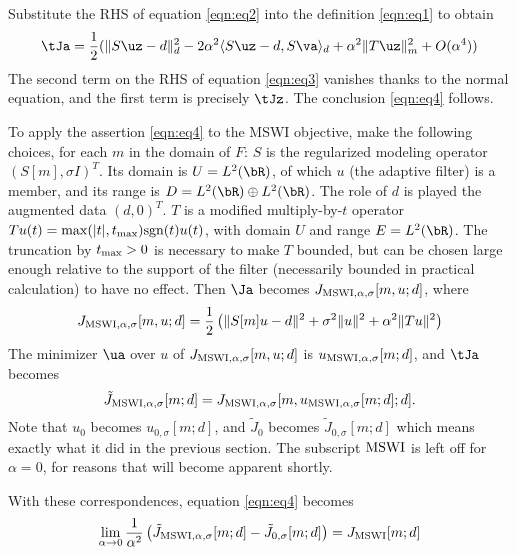 Substitute the RHS of equation \ref{eqn:eq2} into the definition \ref{eqn:eq1} to obtain
\begin{equation}
  \label{eqn:eq3}
  \tJa = \frac{1}{2}(\|S\uz-d\|_d^2 - 2 \alpha^2\langle S\uz-d, S\va\rangle_d + \alpha^2\|T\uz\|_m^2 + O(\alpha^4))
\end{equation}
The second term on the RHS of equation \ref{eqn:eq3} vanishes thanks to the normal equation, and the first term is precisely $\tJz$. The conclusion \ref{eqn:eq4} follows.

To apply the assertion \ref{eqn:eq4} to the MSWI objective, make the
following choices, for each $m$ in the domain of $F$: $S$ is the regularized
modeling operator $(S[m],\sigma I)^T$.  Its domain is $U=L^2(\bR)$, of
which $u$ (the adaptive filter) is a member, and 
its range is $D = L^2(\bR) \oplus
L^2(\bR)$. The role of $d$ is played  the
augmented data $(d,0)^T$. $T$ is a modified multiply-by-$t$ operator
$Tu(t)=\max(|t|, t_{\rm max}) \mbox{sgn}(t)u(t)$, with domain $U$ and
range $E=L^2(\bR)$. The truncation by $t_{\rm max} > 0$ is necessary
to make $T$ bounded, but can be chosen large enough relative to the
support of the filter (necessarily bounded in practical calculation)
to have no effect. Then $\Ja$ becomes $J_{{\rm MSWI},\alpha,\sigma}[m,u;d]$, where
\begin{equation}
  \label{eqn:eq5}
   J_{{\rm MSWI},\alpha,\sigma}[m,u;d] = \frac{1}{2}\left(\|S[m]u-d\|^2 +
   \sigma^2\|u\|^2 + \alpha^2\|Tu\|^2\right)
 \end{equation}
The minimizer $\ua$ over $u$ of $ J_{{\rm MSWI}, \alpha,\sigma}[m,u;d]$ is
$u_{{\rm MSWI},\alpha,\sigma}[m;d]$, and $\tJa$ becomes
\begin{equation}
  \label{eqn:eq6}
  \tilde{J}_{{\rm MSWI},\alpha,\sigma}[m;d] =
  J_{{\rm MSWI},\alpha,\sigma}[m,u_{{\rm MSWI},\alpha,\sigma}[m;d];d].
\end{equation}
Note that $u_0$ becomes $u_{0,\sigma}[m;d]$, and $\tilde{J}_0$ becomes
$\tilde{J}_{0,\sigma}[m;d]$ which means exactly what
it did in the previous section. The subscript ${\rm MSWI}$ is left
off for $\alpha=0$, for reasons that will become apparent shortly.

With these correspondences, equation \ref{eqn:eq4} becomes
\begin{equation}
  \label{eq7}
  \lim_{\alpha \rightarrow 0}
  \frac{1}{\alpha^2}\left(\tilde{J}_{{\rm MSWI},\alpha,\sigma}[m;d]-\tilde{J}_{0,\sigma}[m;d]\right)=
  J_{\rm MSWI}[m;d]
\end{equation}

